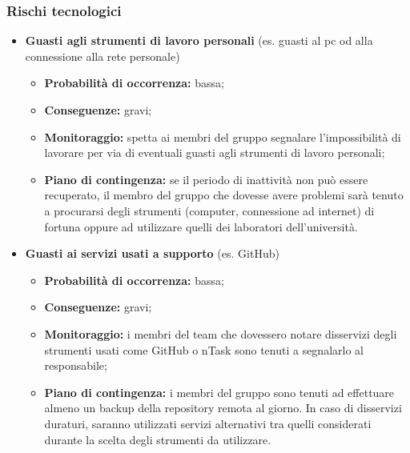 	\subsubsection{Rischi tecnologici}
		\begin{itemize}
			\item \textbf{Guasti agli strumenti di lavoro personali} (es. guasti al pc od alla connessione alla rete personale)
				\begin{itemize}
					\item \textbf{Probabilità di occorrenza:} bassa;
					\item \textbf{Conseguenze:} gravi;
					\item \textbf{Monitoraggio:} spetta ai membri del gruppo segnalare l'impossibilità di lavorare per via di eventuali guasti agli strumenti di lavoro personali;
					\item \textbf{Piano di contingenza:} se il periodo di inattività non può essere recuperato, il membro del gruppo che dovesse avere problemi sarà tenuto a procurarsi degli strumenti (computer, connessione ad internet) di fortuna oppure ad utilizzare quelli dei laboratori dell'università.
				\end{itemize}
			\item \textbf{Guasti ai servizi usati a supporto} (es. GitHub)
				\begin{itemize}
					\item \textbf{Probabilità di occorrenza:} bassa;
					\item \textbf{Conseguenze:} gravi;
					\item \textbf{Monitoraggio:} i membri del team che dovessero notare disservizi degli strumenti usati come GitHub o nTask sono tenuti a segnalarlo al responsabile;
					\item \textbf{Piano di contingenza:} i membri del gruppo sono tenuti ad effettuare almeno un backup della repository remota al giorno. In caso di disservizi duraturi, saranno utilizzati servizi alternativi tra quelli considerati	durante la scelta degli strumenti da utilizzare.
				\end{itemize}
		\end{itemize}
